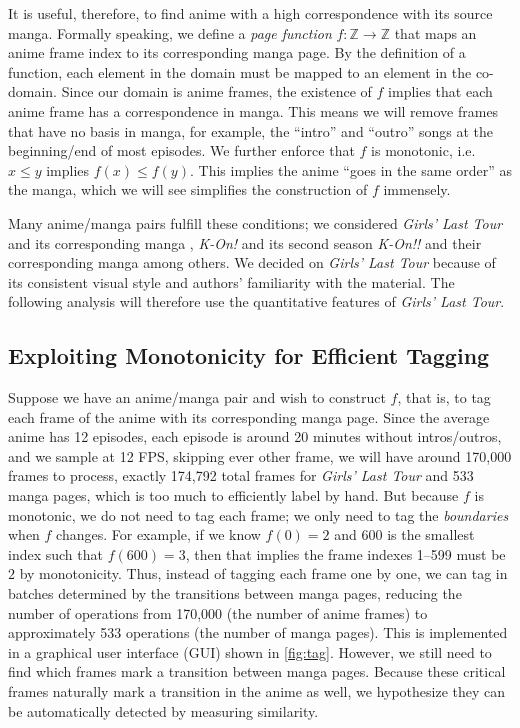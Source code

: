 \documentclass[11pt, oneside]{article}
\begin{document}
It is useful, therefore, to find anime with a high correspondence with
its source manga. Formally speaking, we define a \textit{page function}
\( f: \mathbb{Z} \to \mathbb{Z} \) that maps an anime frame index to its
corresponding manga page. By the definition of a function, each element in
the domain must be mapped to an element in the co-domain. Since our domain
is anime frames, the existence of \( f \) implies that each anime frame
has a correspondence in manga. This means we will remove frames that have
no basis in manga, for example, the \enquote{intro} and \enquote{outro}
songs at the beginning/end of most episodes. We further enforce that \( f
\) is monotonic, i.e. \( x \leq y \) implies \( f(x) \leq f(y) \). This
implies the anime \enquote{goes in the same order} as the manga, which we
will see simplifies the construction of \( f \) immensely.

Many anime/manga pairs fulfill these conditions; we considered \textit{Girls'
Last Tour} \cite{tour} and its corresponding manga \cite{tour1, tour2, tour3,
tour4}, \textit{K-On!} \cite{kon!} and its second season \textit{K-On!!}
\cite{kon!!} and their corresponding manga \cite{kon1, kon2, kon3, kon4} among
others. We decided on \textit{Girls' Last Tour} because of its consistent
visual style and authors' familiarity with the material. The following analysis
will therefore use the quantitative features of \textit{Girls' Last Tour}.

\subsection{Exploiting Monotonicity for Efficient Tagging}
Suppose we have an anime/manga pair and wish to construct \( f \), that is,
to tag each frame of the anime with its corresponding manga page. Since the
average anime has 12 episodes, each episode is around 20 minutes without
intros/outros, and we sample at 12 FPS, skipping ever other frame, we will
have around 170,000 frames to process, exactly 174,792 total frames for
\textit{Girls' Last Tour} and 533 manga pages, which is too much to efficiently
label by hand. But because \( f \) is monotonic, we do not need to tag each
frame; we only need to tag the \textit{boundaries} when \( f \) changes.
For example, if we know \( f(0) = 2 \) and \( 600 \) is the smallest index
such that \( f(600) = 3 \), then that implies the frame indexes 1--599 must
be \( 2 \) by monotonicity. Thus, instead of tagging each frame one by one,
we can tag in batches determined by the transitions between manga pages,
reducing the number of operations from 170,000 (the number of anime frames) to
approximately 533 operations (the number of manga pages). This is implemented
in a graphical user interface (GUI) shown in \autoref{fig:tag}. However, we
still need to find which frames mark a transition between manga pages. Because
these critical frames naturally mark a transition in the anime as well, we
hypothesize they can be automatically detected by measuring similarity.
\end{document}
